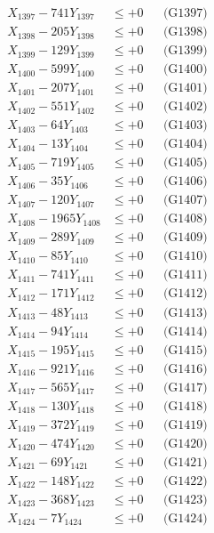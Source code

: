 \documentclass[a4paper,10pt]{article}
\begin{document}
{\begin{align}
X_{1397} - 741Y_{1397} &\leq +0 && \text{(G1397)} \\
X_{1398} - 205Y_{1398} &\leq +0 && \text{(G1398)} \\
X_{1399} - 129Y_{1399} &\leq +0 && \text{(G1399)} \\
X_{1400} - 599Y_{1400} &\leq +0 && \text{(G1400)} \\
\allowbreak
X_{1401} - 207Y_{1401} &\leq +0 && \text{(G1401)} \\
X_{1402} - 551Y_{1402} &\leq +0 && \text{(G1402)} \\
X_{1403} - 64Y_{1403} &\leq +0 && \text{(G1403)} \\
X_{1404} - 13Y_{1404} &\leq +0 && \text{(G1404)} \\
X_{1405} - 719Y_{1405} &\leq +0 && \text{(G1405)} \\
X_{1406} - 35Y_{1406} &\leq +0 && \text{(G1406)} \\
X_{1407} - 120Y_{1407} &\leq +0 && \text{(G1407)} \\
X_{1408} - 1965Y_{1408} &\leq +0 && \text{(G1408)} \\
X_{1409} - 289Y_{1409} &\leq +0 && \text{(G1409)} \\
X_{1410} - 85Y_{1410} &\leq +0 && \text{(G1410)} \\
\allowbreak
X_{1411} - 741Y_{1411} &\leq +0 && \text{(G1411)} \\
X_{1412} - 171Y_{1412} &\leq +0 && \text{(G1412)} \\
X_{1413} - 48Y_{1413} &\leq +0 && \text{(G1413)} \\
X_{1414} - 94Y_{1414} &\leq +0 && \text{(G1414)} \\
X_{1415} - 195Y_{1415} &\leq +0 && \text{(G1415)} \\
X_{1416} - 921Y_{1416} &\leq +0 && \text{(G1416)} \\
X_{1417} - 565Y_{1417} &\leq +0 && \text{(G1417)} \\
X_{1418} - 130Y_{1418} &\leq +0 && \text{(G1418)} \\
X_{1419} - 372Y_{1419} &\leq +0 && \text{(G1419)} \\
X_{1420} - 474Y_{1420} &\leq +0 && \text{(G1420)} \\
\allowbreak
X_{1421} - 69Y_{1421} &\leq +0 && \text{(G1421)} \\
X_{1422} - 148Y_{1422} &\leq +0 && \text{(G1422)} \\
X_{1423} - 368Y_{1423} &\leq +0 && \text{(G1423)} \\
X_{1424} - 7Y_{1424} &\leq +0 && \text{(G1424)} \\

\end{align}}
\end{document}
